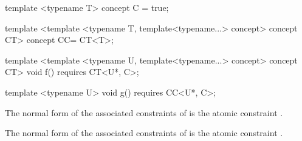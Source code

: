 \documentclass{wg21}
\begin{document}
\begin{itemize}
\begin{addedblock}
\begin{example}
\begin{codeblock}
template <typename T>
concept C = true;

template <template <typename T, template<typename...> concept> concept CT>
concept CC= CT<T>;

template <template <typename U, template<typename...> concept> concept CT>
void f() requires CT<U*, C>;

template <typename U>
void g() requires CC<U*, C>;
\end{codeblock}

The normal form of the associated constraints of  is the
atomic constraint .

The normal form of the associated constraints of  is the
atomic constraint .


\end{example}
\end{addedblock}
\end{itemize}
\end{document}
